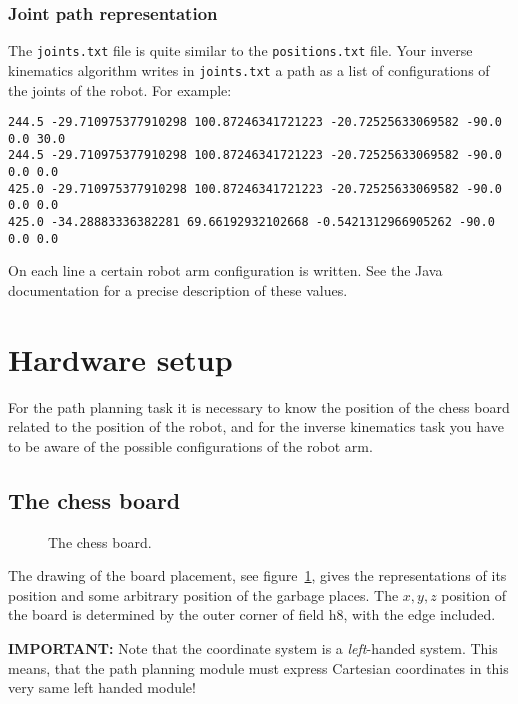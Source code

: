 \documentclass[10pt]{scrartcl}
\begin{document}
\subsubsection{Joint path representation}
The \verb|joints.txt| file is quite similar to the \verb|positions.txt|
file. Your inverse kinematics algorithm writes in \verb|joints.txt|
a path as a list of configurations of the joints of the robot. For
example:
\begin{verbatim}
244.5 -29.710975377910298 100.87246341721223 -20.72525633069582 -90.0 0.0 30.0
244.5 -29.710975377910298 100.87246341721223 -20.72525633069582 -90.0 0.0 0.0
425.0 -29.710975377910298 100.87246341721223 -20.72525633069582 -90.0 0.0 0.0
425.0 -34.28883336382281 69.66192932102668 -0.5421312966905262 -90.0 0.0 0.0
\end{verbatim}
On each line a certain robot arm configuration is written. See the Java
documentation for a precise description of these values.

\section{Hardware setup}
\label{sec:Hardware}

For the path planning task it is necessary to know the position of the
chess board related to the position of the robot, and for the inverse
kinematics task you have to be aware of the possible configurations of
the robot arm.

\subsection{The chess board}
\label{setup}

\begin{figure}[htp]
  \centerline{}
  \caption{The chess board.}
  \label{FIG_chess_board}
\end{figure}

The drawing of the board placement, see figure~\ref{FIG_chess_board}, gives the
representations of its position and some arbitrary position of the garbage
places. The $x, y, z$ position of the board is determined by the outer corner
of field h8, with the edge included. %

{\bfseries IMPORTANT:} Note that the coordinate system is a {\em
left}-handed system. This means, that the path planning module must
express Cartesian coordinates in this very same left handed module! 
\end{document}
